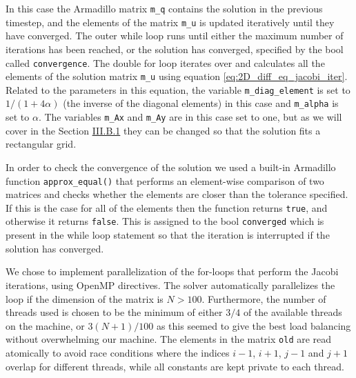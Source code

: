 \documentclass[reprint,english,notitlepage]{revtex4-1}  %
\begin{document}
In this case the Armadillo matrix \verb+m_q+ contains the solution in the previous timestep, and the elements of the matrix \verb+m_u+ is updated iteratively until they have converged. The outer while loop runs until either the maximum number of iterations has been reached, or the solution has converged, specified by the bool called \verb+convergence+. The double for loop iterates over and calculates all the elements of the solution matrix \verb+m_u+ using equation \eqref{eq:2D_diff_eq_jacobi_iter}. Related to the parameters in this equation, the variable \verb+m_diag_element+ is set to $1/(1 + 4\alpha)$ (the inverse of the diagonal elements) in this case and \verb+m_alpha+ is set to $\alpha$. The variables \verb+m_Ax+ and \verb+m_Ay+ are in this case set to one, but as we will cover in the Section \hyperref[sec:method_heat_solver]{III.B.1} they can be changed so that the solution fits a rectangular grid. 

In order to check the convergence of the solution we used a built-in Armadillo function \verb+approx_equal()+ that performs an element-wise comparison of two matrices and checks whether the elements are closer than the tolerance specified. If this is the case for all of the elements then the function returns \verb+true+, and otherwise it returns \verb+false+. This is assigned to the bool \verb+converged+ which is present in the while loop statement so that the iteration is interrupted if the solution has converged.

We chose to implement parallelization of the for-loops that perform the Jacobi iterations, using OpenMP directives. The solver automatically parallelizes the loop if the dimension of the matrix is \(N > 100\). Furthermore, the number of threads used is chosen to be the minimum of either \(3/4\) of the available threads on the machine, or \(3(N+1)/100\) as this seemed to give the best load balancing without overwhelming our machine. The elements in the matrix \verb+old+ are read atomically to avoid race conditions where the indices \(i-1\), \(i+1\), \(j-1\) and \(j+1\) overlap for different threads, while all constants are kept private to each thread.

\end{document}
